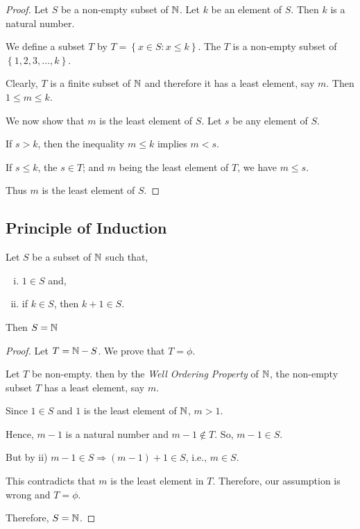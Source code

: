 \documentclass[11pt]{scrartcl}
\begin{document}
		\begin{proof}
			Let $S$ be a non-empty subset of $\mathbb N$. Let $k$ be an element of $S$. Then $k$ is a natural number.
			
			We define a subset $T$ by $T = \left\{ x \in S : x \leq k \right\}$. The $T$ is a non-empty subset of $\left\{ 1,2,3,\dots, k \right\}$.
			
			Clearly, $T$ is a finite subset of $\mathbb N$ and therefore it has a least element, say $m$. Then $1 \leq m \leq k$.
			
			We now show that $m$ is the least element of $S$. Let $s$ be any element of $S$.
			
			If $s>k$, then the inequality $m \leq k$ implies $m<s$.
			
			If $s \leq k$, the $s \in T$; and $m$ being the least element of $T$, we have $m \leq s$.
			
			Thus $m$ is the least element of $S$.
		\end{proof}
	
	\subsection{Principle of Induction}
	\begin{definition}
		Let $S$ be a subset of $\mathbb N$ such that,
		\begin{enumerate}[i)]
			\item  $1 \in S$ and,
			\item  if $k \in S$, then $k+1 \in S$.
		\end{enumerate}
	Then $S = \mathbb N$
	\end{definition}
	
	\begin{proof}
		Let $T = \mathbb N - S$. We prove that $T = \phi$.
		
		Let $T$ be non-empty. then by the \emph{Well Ordering Property} of $\mathbb N$, the non-empty subset $T$ has a least element, say $m$.
		
		Since $1 \in S$ and $1$ is the least element of $\mathbb N$, $m>1$.
		
		Hence, $m-1$ is a natural number and $m-1 \notin T$. So, $m-1 \in S$.
		
		But by ii) $m-1 \in S \Rightarrow (m-1)+1 \in S$, i.e., $m \in S$.
		
		This contradicts that $m$ is the least element in $T$. Therefore, our assumption is wrong and $T = \phi$.
		
		Therefore, $S=\mathbb N$.
	\end{proof}
		 
\end{document}
